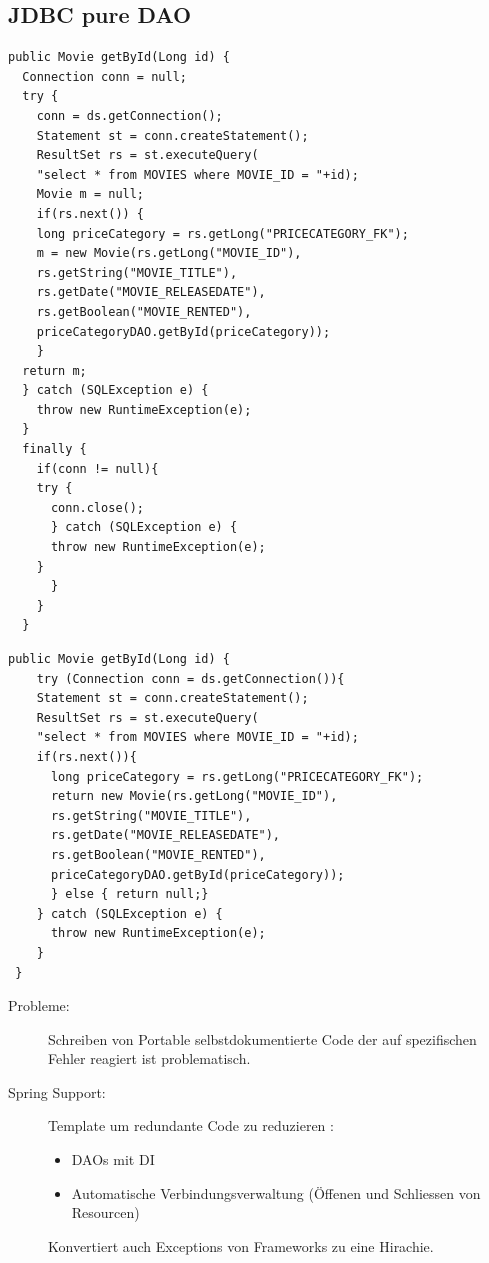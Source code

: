 \documentclass[a4paper,10pt]{scrreprt}
\begin{document}
\subsection{JDBC pure DAO}
\begin{lstlisting}[caption=JDBC DAO]
public Movie getById(Long id) {
  Connection conn = null;
  try {
    conn = ds.getConnection();
    Statement st = conn.createStatement();
    ResultSet rs = st.executeQuery(
    "select * from MOVIES where MOVIE_ID = "+id);
    Movie m = null;
    if(rs.next()) {
    long priceCategory = rs.getLong("PRICECATEGORY_FK");
    m = new Movie(rs.getLong("MOVIE_ID"),
    rs.getString("MOVIE_TITLE"),
    rs.getDate("MOVIE_RELEASEDATE"),
    rs.getBoolean("MOVIE_RENTED"),
    priceCategoryDAO.getById(priceCategory));
    }
  return m;
  } catch (SQLException e) {
    throw new RuntimeException(e);
  }
  finally {
    if(conn != null){
	try {
	  conn.close();
      } catch (SQLException e) {
	  throw new RuntimeException(e);
	}
      }
    }
  }
\end{lstlisting}

\begin{lstlisting}[caption=PureJDBC Java 7]
 public Movie getById(Long id) {
    try (Connection conn = ds.getConnection()){
    Statement st = conn.createStatement();
    ResultSet rs = st.executeQuery(
    "select * from MOVIES where MOVIE_ID = "+id);
    if(rs.next()){
      long priceCategory = rs.getLong("PRICECATEGORY_FK");
      return new Movie(rs.getLong("MOVIE_ID"),
      rs.getString("MOVIE_TITLE"),
      rs.getDate("MOVIE_RELEASEDATE"),
      rs.getBoolean("MOVIE_RENTED"),
      priceCategoryDAO.getById(priceCategory));
      } else { return null;}
    } catch (SQLException e) {
      throw new RuntimeException(e);
    }
 }
\end{lstlisting}
\begin{description}
\item[Probleme:] Schreiben von Portable selbstdokumentierte Code der auf spezifischen Fehler reagiert ist problematisch.
\item[Spring Support:] Template um redundante Code zu reduzieren :\\
\begin{itemize}
 \item DAOs mit DI
 \item Automatische Verbindungsverwaltung (Öffenen und Schliessen von Resourcen)
\end{itemize}
Konvertiert auch Exceptions von Frameworks zu eine Hirachie.
\end{description}
\end{document}
